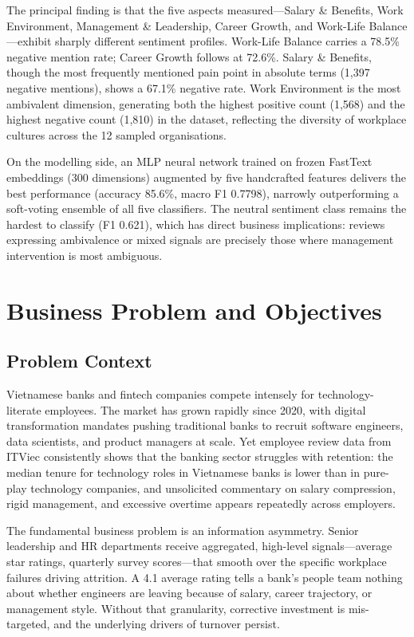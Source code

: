 \documentclass[12pt, a4paper]{article}
\begin{document}
The principal finding is that the five aspects measured---Salary \& Benefits, Work Environment, Management \& Leadership, Career Growth, and Work-Life Balance---exhibit sharply different sentiment profiles. Work-Life Balance carries a 78.5\% negative mention rate; Career Growth follows at 72.6\%. Salary \& Benefits, though the most frequently mentioned pain point in absolute terms (1,397 negative mentions), shows a 67.1\% negative rate. Work Environment is the most ambivalent dimension, generating both the highest positive count (1,568) and the highest negative count (1,810) in the dataset, reflecting the diversity of workplace cultures across the 12 sampled organisations.

On the modelling side, an MLP neural network trained on frozen FastText embeddings (300 dimensions) augmented by five handcrafted features delivers the best performance (accuracy 85.6\%, macro F1 0.7798), narrowly outperforming a soft-voting ensemble of all five classifiers. The neutral sentiment class remains the hardest to classify (F1 0.621), which has direct business implications: reviews expressing ambivalence or mixed signals are precisely those where management intervention is most ambiguous.

\section{Business Problem and Objectives}

\subsection{Problem Context}

Vietnamese banks and fintech companies compete intensely for technology-literate employees. The market has grown rapidly since 2020, with digital transformation mandates pushing traditional banks to recruit software engineers, data scientists, and product managers at scale. Yet employee review data from ITViec consistently shows that the banking sector struggles with retention: the median tenure for technology roles in Vietnamese banks is lower than in pure-play technology companies, and unsolicited commentary on salary compression, rigid management, and excessive overtime appears repeatedly across employers.

The fundamental business problem is an information asymmetry. Senior leadership and HR departments receive aggregated, high-level signals---average star ratings, quarterly survey scores---that smooth over the specific workplace failures driving attrition. A 4.1 average rating tells a bank's people team nothing about whether engineers are leaving because of salary, career trajectory, or management style. Without that granularity, corrective investment is mis-targeted, and the underlying drivers of turnover persist.
\end{document}
